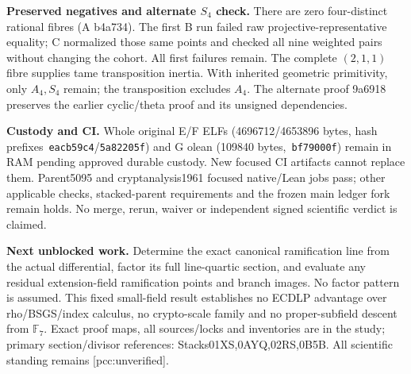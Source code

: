\documentclass[10pt,a4paper]{article}
\begin{document}
\textbf{Preserved negatives and alternate $S_4$ check.} There are zero
four-distinct rational fibres (A b4a734). The first B run failed raw
projective-representative equality; C normalized those same points and
checked all nine weighted pairs without changing the cohort. All first
failures remain. The complete $(2,1,1)$ fibre supplies tame transposition
inertia. With inherited geometric primitivity, only $A_4,S_4$ remain;
the transposition excludes $A_4$. The alternate proof 9a6918 preserves
the earlier cyclic/theta proof and its unsigned dependencies.

\textbf{Custody and CI.} Whole original E/F ELFs (4696712/4653896 bytes,
hash prefixes~\texttt{eacb59c4}/\texttt{5a82205f}) and G olean
(109840 bytes,~\texttt{bf79000f}) remain in RAM pending approved durable
custody. New focused CI artifacts cannot replace them. Parent5095 and
cryptanalysis1961 focused native/Lean jobs pass; other applicable checks,
stacked-parent requirements and the frozen main ledger fork remain holds.
No merge, rerun, waiver or independent signed scientific verdict is claimed.

\textbf{Next unblocked work.} Determine the exact canonical ramification
line from the actual differential, factor its full line-quartic section,
and evaluate any residual extension-field ramification points and branch
images. No factor pattern is assumed. This fixed small-field result
establishes no ECDLP advantage over rho/BSGS/index calculus, no
crypto-scale family and no proper-subfield descent from $\mathbb F_7$.
Exact proof maps, all sources/locks and inventories are in the study;
primary section/divisor references: Stacks01XS,0AYQ,02RS,0B5B.
All scientific standing remains [pcc:unverified].
\end{document}
